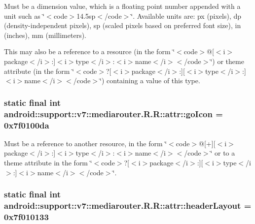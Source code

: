 Must be a dimension value, which is a floating point number appended with a unit such as \char`\"{}$<$code$>$14.5sp$<$/code$>$\char`\"{}. Available units are: px (pixels), dp (density-independent pixels), sp (scaled pixels based on preferred font size), in (inches), mm (millimeters). 

This may also be a reference to a resource (in the form \char`\"{}$<$code$>$@\mbox{[}$<$i$>$package$<$/i$>$:\mbox{]}$<$i$>$type$<$/i$>$:$<$i$>$name$<$/i$>$$<$/code$>$\char`\"{}) or theme attribute (in the form \char`\"{}$<$code$>$?\mbox{[}$<$i$>$package$<$/i$>$:\mbox{]}\mbox{[}$<$i$>$type$<$/i$>$:\mbox{]}$<$i$>$name$<$/i$>$$<$/code$>$\char`\"{}) containing a value of this type. \hypertarget{classandroid_1_1support_1_1v7_1_1mediarouter_1_1_r_1_1attr_5861695b000113ced9a979537d906a50}{
\subsubsection[{goIcon}]{\setlength{\rightskip}{0pt plus 5cm}static final int android::support::v7::mediarouter.R.R::attr::goIcon = 0x7f0100da}}
\label{classandroid_1_1support_1_1v7_1_1mediarouter_1_1_r_1_1attr_5861695b000113ced9a979537d906a50}


Must be a reference to another resource, in the form \char`\"{}$<$code$>$@\mbox{[}+\mbox{]}\mbox{[}$<$i$>$package$<$/i$>$:\mbox{]}$<$i$>$type$<$/i$>$:$<$i$>$name$<$/i$>$$<$/code$>$\char`\"{} or to a theme attribute in the form \char`\"{}$<$code$>$?\mbox{[}$<$i$>$package$<$/i$>$:\mbox{]}\mbox{[}$<$i$>$type$<$/i$>$:\mbox{]}$<$i$>$name$<$/i$>$$<$/code$>$\char`\"{}. \hypertarget{classandroid_1_1support_1_1v7_1_1mediarouter_1_1_r_1_1attr_839adae0ea35d068d22b09aaba515d5c}{
\subsubsection[{headerLayout}]{\setlength{\rightskip}{0pt plus 5cm}static final int android::support::v7::mediarouter.R.R::attr::headerLayout = 0x7f010133}}
\label{classandroid_1_1support_1_1v7_1_1mediarouter_1_1_r_1_1attr_839adae0ea35d068d22b09aaba515d5c}


